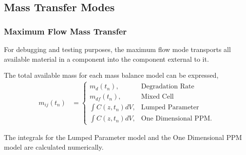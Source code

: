 \subsection{Mass Transfer Modes}\label{sec:mass_transfer}






\subsubsection{Maximum Flow Mass Transfer}\label{sed:max_flow_mass_transfer}

For debugging and testing purposes, the maximum flow mode transports all 
available material in a component into the component external to it. 

The total available mass for each mass balance model can be expressed,
\begin{align}
m_{ij}(t_n) &= \begin{cases}
                         m_{d}(t_n), & \mbox{Degradation Rate}\\
                         m_{df}(t_n), & \mbox{Mixed Cell}\\
                         \int C(z,t_n)dV, & \mbox{Lumped Parameter}\\
                         \int C(z,t_n)dV, & \mbox{One Dimensional PPM}.
               \end{cases}
\end{align}

The integrals for the Lumped Parameter model and the One Dimensional PPM model 
are calculated numerically.

